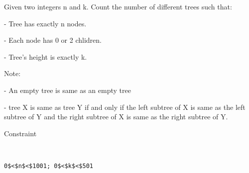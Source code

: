 Given two integers n and k. Count the number of different trees such that:  

   - Tree has exactly n nodes.  

   - Each node has 0 or 2 chlidren.  

   - Tree's height is exactly k.  

   Note:  

   - An empty tree is same as an empty tree  

   - tree X is same as tree Y if and only if the left subtree of X is same as the left subtree of Y and the right subtree of X is same as the right subtree of Y.  

Constraint
\begin{verbatim}


0$<$n$<$1001; 0$<$k$<$501\end{verbatim}